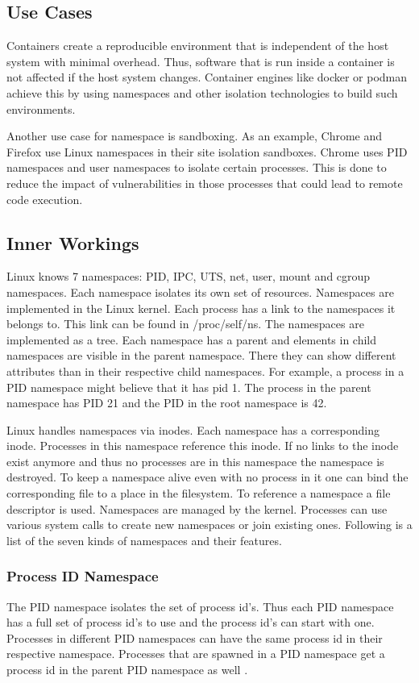 \documentclass[10pt,twocolumn,a4paper]{article}
\begin{document}
\subsection{Use Cases}
Containers create a reproducible environment that is independent of the host system with minimal overhead.
Thus, software that is run inside a container is not affected if the host system changes. 
Container engines like docker or podman achieve this by using namespaces and other isolation
technologies to build such environments\cite{33}.


Another use case for namespace is sandboxing. As an example, Chrome and Firefox use Linux namespaces
in their site isolation sandboxes. 
Chrome uses PID namespaces and user namespaces to isolate certain processes.
This is done to reduce the impact of vulnerabilities in those processes that could lead to remote
code execution\cite{32,34}.


\subsection{Inner Workings}
Linux knows 7 namespaces: PID, IPC, UTS, net, user, mount and cgroup namespaces. Each namespace isolates its own set of resources. Namespaces are implemented in the Linux kernel.
Each process has a link to the namespaces it belongs to. This link can be found in /proc/self/ns\cite{8}.
The namespaces are implemented as a tree.
Each namespace has a parent and elements in child namespaces are visible in the parent namespace.
There they can show different attributes than in their respective child namespaces. 
For example, a process in a PID namespace might believe that it has pid 1.
The process in the parent namespace has PID  21 and the PID in the root namespace is 42.

Linux handles namespaces via inodes. Each namespace has a corresponding inode.
Processes in this namespace reference this inode. 
If no links to the inode exist anymore and thus no processes are in
this namespace the namespace is destroyed. 
To keep a namespace alive even with no process in it one can bind 
the corresponding file to a place in the filesystem.
To reference a namespace a file descriptor is used.
Namespaces are managed by the kernel.
 Processes can use various system calls to create new namespaces or join existing ones.\cite{8}
Following is a list of the seven kinds of namespaces and their features.


\subsubsection{Process ID Namespace}
The PID namespace isolates the set of process id's. 
Thus each PID namespace has a full set of process id's to use and  the process id's can start with one.
Processes in different PID namespaces can have the same process id in their respective namespace. 
Processes that are spawned in a PID namespace get a process id in the parent PID namespace as well 
\cite{11}.
\end{document}

